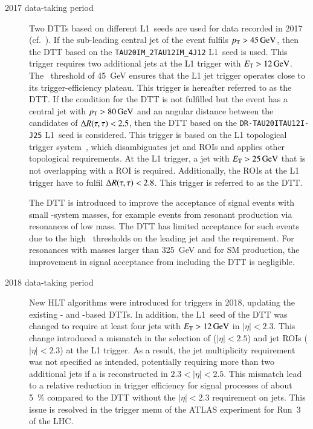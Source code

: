 \begin{description}
\item[2017 data-taking period] Two DTTs based on different L1~seeds are used for
  data recorded in 2017 (cf.~). If the sub-leading
  central jet of the event fulfils $p_{\text{T}} > \SI{45}{\ensuremath{\text{GeV}}}$, then the DTT based on
  the \texttt{TAU20IM\_2TAU12IM\_4J12} L1~seed is used. This trigger requires
  two additional jets at the L1 trigger with $\ET > \SI{12}{\GeV}$. The
  \pT~threshold of \SI{45}{\GeV} ensures that the L1 jet trigger operates close
  to its trigger-efficiency plateau. This trigger is hereafter referred to as
  the \FourJTwelve DTT. If the condition for the \FourJTwelve DTT is not
  fulfilled but the event has a central jet with $\pT > \SI{80}{\GeV}$ and an
  angular distance between the \tauhadvis candidates of $\Delta R(\tau, \tau) < 2.5$, then
  the DTT based on the \texttt{DR-TAU20ITAU12I-J25} L1~seed is considered. This
  trigger is based on the L1 topological trigger system~\cite{TRIG-2019-02},
  which disambiguates jet and \tauhadvis ROIs and applies other topological
  requirements. At the L1 trigger, a jet with $E_{\text{T}} > \SI{25}{\ensuremath{\text{GeV}}}$ that is not
  overlapping with a \tauhadvis ROI is required. Additionally, the \tauhadvis
  ROIs at the L1 trigger have to fulfil $\Delta R(\tau, \tau) < 2.8$. This trigger is
  referred to as the \LOneTopo DTT.

  The \FourJTwelve DTT is introduced to improve the acceptance of signal events
  with small \HH-system masses, for example events from resonant \HH production
  via resonances of low mass. The \LOneTopo DTT has limited acceptance for such
  events due to the high \pT~thresholds on the leading jet and the \dRtautau
  requirement. For resonances with masses larger than \SI{325}{\GeV} and for SM
  \HH production, the improvement in signal acceptance from including the
  \FourJTwelve DTT is negligible.

\item[2018 data-taking period] New HLT algorithms were introduced for \tauhadvis
  triggers in 2018, updating the existing \LOneTopo- and \FourJTwelve-based
  DTTs. In addition, the L1~seed of the \FourJTwelve DTT was changed to require
  at least four jets with $\ET > \SI{12}{\GeV}$ in $|\eta| < 2.3$. This change
  introduced a mismatch in the selection of \tauhadvis ($|\eta| < 2.5$) and jet
  ROIs ($|\eta| < 2.3$) at the L1 trigger. As a result, the jet multiplicity
  requirement was not specified as intended, potentially requiring more than two
  additional jets if a \tauhadvis is reconstructed in $2.3 < |\eta| < 2.5$. This
  mismatch lead to a relative reduction in trigger efficiency for signal
  processes of about \SI{5}{\percent} compared to the \FourJTwelve DTT without
  the $|\eta| < 2.3$ requirement on jets. This issue is resolved in the trigger
  menu of the ATLAS experiment for Run~3 of the LHC.
\end{description}


